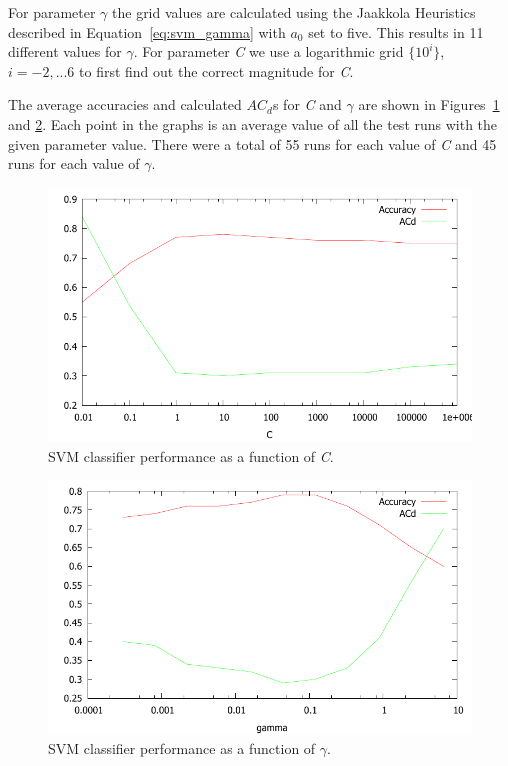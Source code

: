 For parameter $\gamma$ the grid values are calculated using the Jaakkola Heuristics described in Equation~\ref{eq:svm_gamma} with $a_0$ set to five. This results in 11 different values for $\gamma$. For parameter \emph{C} we use a logarithmic grid $\{ 10^{i} \}$, $i = -2, ... 6$ to first find out the correct magnitude for \emph{C}.

The average accuracies and calculated $AC_d$s for \emph{C} and $\gamma$ are shown in Figures~\ref{fig:co2_svm_c} and \ref{fig:co2_svm_gamma}. Each point in the graphs is an average value of all the test runs with the given parameter value. There were a total of 55 runs for each value of \emph{C} and 45 runs for each value of $\gamma$.

\begin{center}
\begin{figure}[h!]
\includegraphics[scale=1.0]{images/co2_svm_c.pdf}
\caption{SVM classifier performance as a function of \emph{C}.}
\label{fig:co2_svm_c}
\end{figure}
\end{center}

\begin{center}
\begin{figure}[h!]
\includegraphics[scale=1.0]{images/co2_svm_gamma.pdf}
\caption{SVM classifier performance as a function of $\gamma$.}
\label{fig:co2_svm_gamma}
\end{figure}
\end{center}

